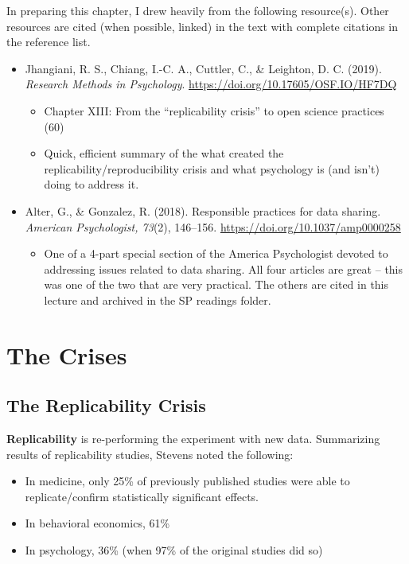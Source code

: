 \documentclass[
  english,
]{book}
\providecommand{\tightlist}{%
  \setlength{\itemsep}{0pt}\setlength{\parskip}{0pt}}
\begin{document}
In preparing this chapter, I drew heavily from the following resource(s). Other resources are cited (when possible, linked) in the text with complete citations in the reference list.

\begin{itemize}
\tightlist
\item
  Jhangiani, R. S., Chiang, I.-C. A., Cuttler, C., \& Leighton, D. C. (2019). \emph{Research Methods in Psychology}. \url{https://doi.org/10.17605/OSF.IO/HF7DQ}

  \begin{itemize}
  \tightlist
  \item
    Chapter XIII: From the ``replicability crisis'' to open science practices (60)
  \item
    Quick, efficient summary of the what created the replicability/reproducibility crisis and what psychology is (and isn't) doing to address it.
  \end{itemize}
\item
  Alter, G., \& Gonzalez, R. (2018). Responsible practices for data sharing. \emph{American Psychologist, 73}(2), 146--156. \url{https://doi.org/10.1037/amp0000258}

  \begin{itemize}
  \tightlist
  \item
    One of a 4-part special section of the America Psychologist devoted to addressing issues related to data sharing. All four articles are great -- this was one of the two that are very practical. The others are cited in this lecture and archived in the SP readings folder.
  \end{itemize}
\end{itemize}

\hypertarget{the-crises}{%
\section{The Crises}\label{the-crises}}

\hypertarget{the-replicability-crisis}{%
\subsection{The Replicability Crisis}\label{the-replicability-crisis}}

\textbf{Replicability} is re-performing the experiment with new data. Summarizing results of replicability studies, Stevens \citeyearpar{stevens_replicability_2017} noted the following:

\begin{itemize}
\tightlist
\item
  In medicine, only 25\% of previously published studies were able to replicate/confirm statistically significant effects.
\item
  In behavioral economics, 61\%
\item
  In psychology, 36\% (when 97\% of the original studies did so)
\end{itemize}
\end{document}

